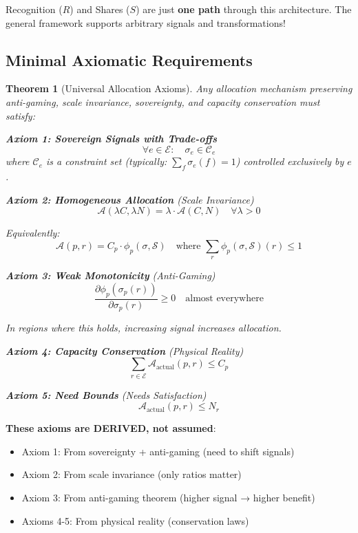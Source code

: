 \documentclass[11pt,a4paper]{article}
\newtheorem{theorem}{Theorem}[section]
\theoremstyle{definition}
\theoremstyle{remark}
\newcommand{\E}{\mathcal{E}}
\begin{document}
Recognition ($R$) and Shares ($S$) are just \textbf{one path} through this architecture. The general framework supports arbitrary signals and transformations!

\subsection{Minimal Axiomatic Requirements}

\begin{theorem}[Universal Allocation Axioms]
Any allocation mechanism preserving anti-gaming, scale invariance, sovereignty, and capacity conservation must satisfy:

\textbf{Axiom 1: Sovereign Signals with Trade-offs}
\[ \forall e \in \E: \quad \sigma_e \in \mathcal{C}_e \]
where $\mathcal{C}_e$ is a constraint set (typically: $\sum_f \sigma_e(f) = 1$) controlled exclusively by $e$.

\textbf{Axiom 2: Homogeneous Allocation} (Scale Invariance)
\[ \mathcal{A}(\lambda C, \lambda N) = \lambda \cdot \mathcal{A}(C, N) \quad \forall \lambda > 0 \]

Equivalently:
\[ \mathcal{A}(p,r) = C_p \cdot \phi_p(\sigma, \mathcal{S}) \quad \text{where } \sum_r \phi_p(\sigma, \mathcal{S})(r) \le 1 \]

\textbf{Axiom 3: Weak Monotonicity} (Anti-Gaming)
\[ \frac{\partial \phi_p(\sigma_p(r))}{\partial \sigma_p(r)} \ge 0 \quad \text{almost everywhere} \]

In regions where this holds, increasing signal increases allocation.

\textbf{Axiom 4: Capacity Conservation} (Physical Reality)
\[ \sum_{r \in \E} \mathcal{A}_{\text{actual}}(p,r) \le C_p \]

\textbf{Axiom 5: Need Bounds} (Needs Satisfaction)
\[ \mathcal{A}_{\text{actual}}(p,r) \le N_r \]
\end{theorem}

\textbf{These axioms are DERIVED, not assumed}:
\begin{itemize}
\item Axiom 1: From sovereignty + anti-gaming (need to shift signals)
\item Axiom 2: From scale invariance (only ratios matter)
\item Axiom 3: From anti-gaming theorem (higher signal → higher benefit)
\item Axioms 4-5: From physical reality (conservation laws)
\end{itemize}
\end{document}

